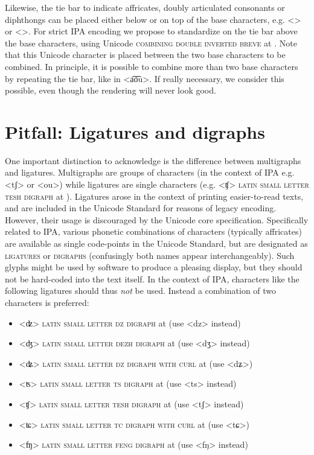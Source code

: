 Likewise, the tie bar to indicate affricates, doubly articulated consonants or
diphthongs can be placed either below or on top of the base characters, e.g.
<> or <>. For strict IPA encoding we propose to standardize on the tie bar
above the base characters, using Unicode \textsc{combining double inverted
breve} at . Note that this Unicode character is placed between the two 
base characters to be combined. In principle, it is possible to combine more 
than two base characters by repeating the tie bar, like in <a͡o͡u>. If really
necessary, we consider this possible, even though the rendering will never look 
good.


\section{Pitfall: Ligatures and digraphs}
\label{pitfall-ligatures-digraphs}     
       
One important distinction to acknowledge is the difference between multigraphs
and ligatures. Multigraphs are groups of characters (in the context of IPA e.g.
<tʃ> or <ou>) while ligatures are single characters (e.g. <ʧ> \textsc{latin
small letter tesh digraph} at ). Ligatures arose in the context of
printing easier-to-read texts, and are included in the Unicode Standard for
reasons of legacy encoding. However, their usage is discouraged by the Unicode
core specification. Specifically related to IPA, various phonetic combinations
of characters (typically affricates) are available as single code-points in the
Unicode Standard, but are designated as \textsc{ligatures} or \textsc{digraphs}
(confusingly both names appear interchangeably). Such glyphs might be used by
software to produce a pleasing display, but they should not be hard-coded into
the text itself. In the context of IPA, characters like the following ligatures
should thus \emph{not} be used. Instead a combination of two characters is
preferred:
      
\begin{itemize} 
	\item <ʣ> \textsc{latin small letter dz digraph} at  
	  (use <dz> instead) 
    \item <ʤ> \textsc{latin small letter dezh digraph} at 
      (use <dʒ> instead)
    \item <ʥ> \textsc{latin small letter dz digraph with curl} at 
      (use <dʑ>)
    \item <ʦ> \textsc{latin small letter ts digraph} at  
      (use <ts> instead)
	\item <ʧ> \textsc{latin small letter tesh digraph} at  
	  (use <tʃ> instead) 
    \item <ʨ> \textsc{latin small letter tc digraph with curl} at 
      (use <tɕ>)
   	\item <ʩ> \textsc{latin small letter feng digraph} at 
	  (use <fŋ> instead) 
\end{itemize}

